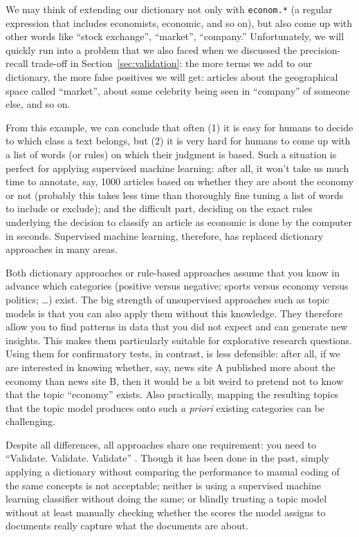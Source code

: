 We may think of extending our dictionary not only with \verb|econom.*| (a
regular expression that includes economists, economic, and so on), but
also come up with other words like ``stock exchange'', ``market'',
``company.'' Unfortunately, we will quickly run into a problem that we also
faced when we discussed the precision-recall trade-off in
Section~\ref{sec:validation}: the more terms we add to our
dictionary, the more false positives we will get: articles about
the geographical space called ``market'', about some celebrity being seen
in ``company'' of someone else, and so on.

From this example, we can conclude that often (1) it is easy for
humans to decide to which class a text belongs, but (2) it is very
hard for humans to come up with a list of words (or rules) on which
their judgment is based.  Such a situation is perfect for applying
supervised machine learning: after all, it won't take us much time to
annotate, say, 1000 articles based on whether they are about the
economy or not (probably this takes less time than thoroughly
fine tuning a list of words to include or exclude); and the difficult part,
deciding on the exact rules underlying the decision to classify an
article as economic is done by the computer in seconds. Supervised
machine learning, therefore, has replaced dictionary approaches in
many areas.

Both dictionary approaches or rule-based approaches assume that you
know in advance which categories (positive versus negative; sports
versus economy versus politics; \ldots) exist. The big strength of unsupervised
approaches such as topic models is that you can also apply them
without this knowledge. They therefore allow you to find patterns
in data that you did not expect and can generate new insights. This
makes them particularly suitable for explorative research questions.
Using them for confirmatory tests, in contrast, is less defensible:
after all, if we are interested in knowing whether, say, news site A
published more about the economy than news site B, then it would be
a bit weird to pretend not to know that the topic ``economy'' exists.
Also practically, mapping the resulting topics that the topic model
produces onto such \emph{a priori} existing categories can be challenging.

Despite all differences, all approaches share one requirement: you
need to ``Validate. Validate. Validate'' \citep{Grimmer2013}. Though
it has been done in the past, simply applying a dictionary without
comparing the performance to manual coding of the same concepts
is not acceptable; neither is using a supervised machine learning
classifier without doing the same; or blindly trusting a topic model
without at least manually checking whether the scores the model assigns
to documents really capture what the documents are about.


